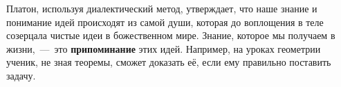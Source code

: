 
Платон, используя диалектический метод, утверждает, что наше знание и понимание идей происходят из самой души, которая до воплощения в теле созерцала чистые идеи в божественном мире. Знание, которое мы получаем в жизни,~---~это \textbf{припоминание} этих идей. Например, на уроках геометрии ученик, не зная теоремы, сможет доказать её, если ему правильно поставить задачу.


